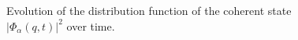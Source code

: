 \begin{figure}
\centering



\caption{Evolution of the distribution function of the coherent state
  $\left|\Phi_{\alpha}\left(q,t\right)\right|^2$ over time.} 
\label{figQCoh_1}
\end{figure}